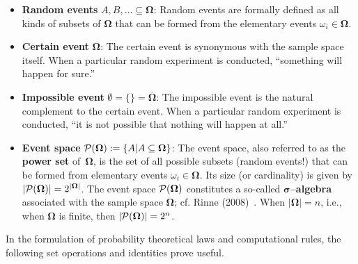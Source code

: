 \begin{itemize}
\item \textbf{Random events} $A, B, \ldots \subseteq 
\boldsymbol{\Omega}$: Random events are formally defined as all 
kinds of subsets of $\boldsymbol{\Omega}$ that can be formed from 
the elementary events $\omega_{i} \in \boldsymbol{\Omega}$.

\item \textbf{Certain event} $\boldsymbol{\Omega}$: The certain
event is synonymous with the sample space itself. When a particular 
random experiment is conducted, ``something will happen for sure.''

\item \textbf{Impossible event} $\emptyset=\{\}
= \bar{\boldsymbol{\Omega}}$: The impossible event is the natural 
complement to the certain event. When a particular random 
experiment is conducted, ``it is not possible that nothing will 
happen at all.''

\item \textbf{Event space} ${\cal P}(\boldsymbol{\Omega}) := \{A|A 
\subseteq \boldsymbol{\Omega}\}$: The event space, also referred 
to as the \textbf{power set} of~$\boldsymbol{\Omega}$, is the set
of all possible subsets (random events!) that can be formed from 
elementary events $\omega_{i} \in \boldsymbol{\Omega}$. Its size 
(or cardinality) is given by $|{\cal P}(\boldsymbol{\Omega})| = 
2^{|\boldsymbol{\Omega}|}$. The event space 
${\cal P}(\boldsymbol{\Omega})$ constitutes a so-called
\textbf{$\boldsymbol{\sigma}$--algebra} associated with the sample
space $\boldsymbol{\Omega}$; cf. Rinne (2008)~.
When $|\boldsymbol{\Omega}|=n$, i.e., when $\boldsymbol{\Omega}$ is 
finite, then $|{\cal P}(\boldsymbol{\Omega})|=2^{n}$.

\end{itemize}
%
In the formulation of probability theoretical laws and 
computational rules, the following set operations and identities 
prove useful.

